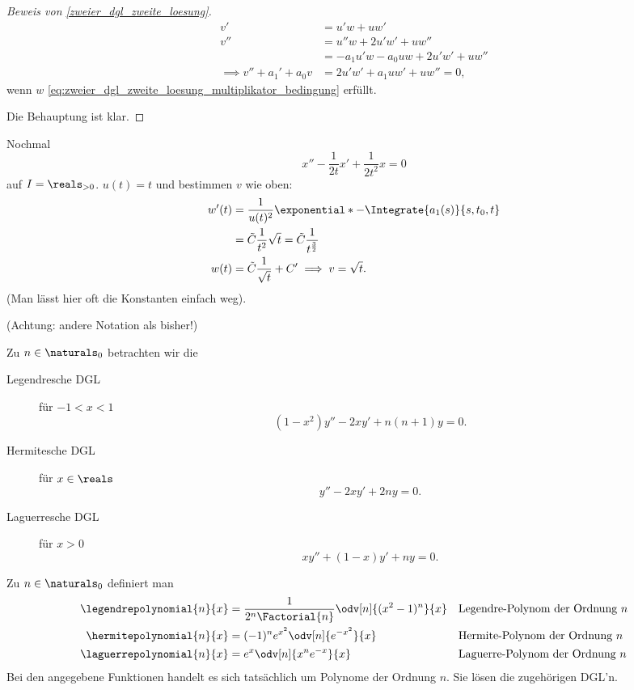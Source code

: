 \begin{proof}[Beweis von \ref{zweier_dgl_zweite_loesung}]
  \begin{align*}
    v'&=u'w+uw'\\
    v''&=u''w+2u'w'+uw''\\
    &=-a_1u'w-a_0uw+2u'w'+uw''\\
    \implies v''+a_1'+a_0v&=2u'w'+a_1uw'+uw''=0,
  \end{align*}
  wenn \( w \) \eqref{eq:zweier_dgl_zweite_loesung_multiplikator_bedingung} erfüllt.

  Die  Behauptung ist klar.
\end{proof}
\begin{beispiel*}
  Nochmal
  \begin{equation*}
    x''-\frac{1}{2t}x'+\frac{1}{2t^2}x=0
  \end{equation*}
auf \( I=\reals_{>0} \). \( u(t)=t \) und bestimmen \( v \) wie oben:
\begin{align*}
  w'(t)&=\frac{1}{u(t)^2}\exponential*{-\Integrate{a_1(s)}{s,t_0,t}}\\
  &=\tilde{C}\frac{1}{t^2}\sqrt{t}=\tilde{C}\frac{1}{t^{\frac{3}{2}}}\\
  w(t)&=\tilde{C}\frac{1}{\sqrt{t}}+C'\implies v=\sqrt{t}.
\end{align*}
(Man lässt hier oft die Konstanten einfach weg).
\end{beispiel*}
\begin{generalthm}[Besondere DGL'n mit \( k=2 \), \( n=1 \)]
  (Achtung: andere Notation als bisher!)

  Zu \( n\in \naturals_0 \) betrachten wir die 
  \begin{description}
    \item[Legendresche DGL] für \( -1<x<1 \)
    \begin{equation*}
      (1-x^2)y''-2xy'+n(n+1)y=0.
    \end{equation*}
    \item[Hermitesche DGL] für \( x\in \reals \)
    \begin{equation*}
      y''-2xy'+2ny=0.
    \end{equation*}
    \item[Laguerresche DGL] für \( x>0 \)
    \begin{equation*}
      xy''+(1-x)y'+ny=0.
    \end{equation*}
  \end{description}
\end{generalthm}
\begin{lemma}
  Zu \( n\in \naturals_0 \) definiert man
  \begin{align*}
    \legendrepolynomial{n}{x}&=\frac{1}{2^n \Factorial{n}}\odv[n]{(x^2-1)^n}{x}&&\text{Legendre-Polynom der Ordnung \( n \)}\\
    \hermitepolynomial{n}{x}&=(-1)^n e^{x^2}\odv[n]{e^{-x^2}}{x}&&\text{Hermite-Polynom der Ordnung \( n \)}\\
    \laguerrepolynomial{n}{x}&=e^x\odv[n]{x^n e^{-x}}{x}&&\text{Laguerre-Polynom der Ordnung \( n \)}
  \end{align*}
  Bei den angegebene Funktionen handelt es sich tatsächlich um Polynome der Ordnung \( n \). Sie lösen die zugehörigen DGL'n.
\end{lemma}

